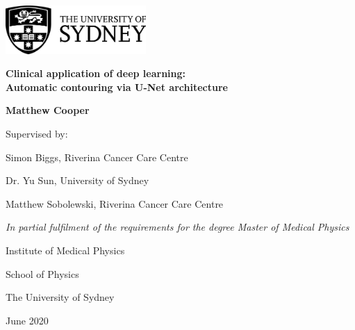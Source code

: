\documentclass[a4paper,oneside, 12pt,parskip=half]{scrbook}
\begin{document}
\begin{titlepage}

\begin{center}
	\includegraphics[width=0.4\textwidth]{figures/usyd_logo}
\end{center}
	\vspace{2cm}
\begin{center}
	\LARGE\textbf{Clinical application of deep learning: \\ Automatic contouring via U-Net architecture}
	\vfill

	\normalsize
  \large{\textbf{Matthew Cooper}}
  \vfill
	
	\normalsize
	Supervised by:

	Simon Biggs, Riverina Cancer Care Centre
  
	Dr. Yu Sun, University of Sydney
  
	Matthew Sobolewski, Riverina Cancer Care Centre 
	
	\vspace{1cm}
	
	\textit{In partial fulfilment of the requirements for the degree Master of Medical Physics}
	
	\vspace{1cm}
	
	Institute of Medical Physics
	
	School of Physics
	
	The University of Sydney
	
\vspace{1cm}
June 2020
	\vfill
  \end{center}
\end{titlepage}

\frontmatter
\tableofcontents




\listoffigures
\listoftables

\mainmatter








\backmatter
\small{\printbibliography[title=References]}
%
\end{document}
